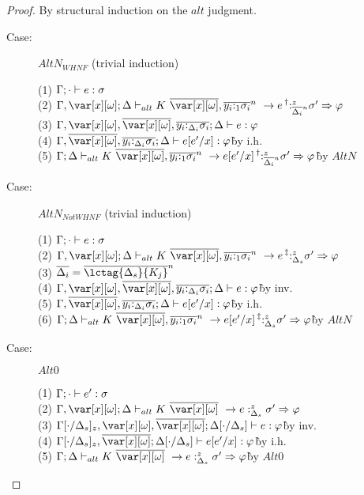 \begin{proof}
By structural induction on the $alt$ judgment.

\begin{description}

\item[Case:] $AltN_{WHNF}$ (trivial induction)
\begin{tabbing}
    (1) $\Gamma; \cdot \vdash e : \sigma$\\
    (2) $\G,\xo;\D \vdash_{alt} \konstructor~\to e \prescript{\dag}{}{:^z_{\ov{\D_i}^n}} \s' \Rightarrow \vp$\\
    (3) $\G,\xo,\ov{\xo},\ov{y_i{:}_{\D_i}\s_i}; \D \vdash e : \vp $\\
    (4) $\G,\ov{\xo},\ov{y_i{:}_{\D_i}\s_i}; \D \vdash e[e'/x] : \vp $\` by i.h.\\
    (5) $\G;\D \vdash_{alt} \konstructor~\to e[e'/x] \prescript{\dag}{}{:^z_{\ov{\D_i}^n}} \s' \Rightarrow \vp$\` by $AltN$\\
\end{tabbing}

\item[Case:] $AltN_{Not WHNF}$ (trivial induction)
\begin{tabbing}
    (1) $\Gamma; \cdot \vdash e : \sigma$\\
    (2) $\G,\xo;\D \vdash_{alt} \konstructor~\to e \prescript{\ddag}{}{:^z_{\D_s}} \s' \Rightarrow \vp$\\
    (3) $\ov{\D_i} = \ov{\lctag{\D_s}{K_j}}^n$\\
    (4) $\G,\xo,\ov{\xo},\ov{y_i{:}_{\D_i}\s_i}; \D \vdash e : \vp $\` by inv.\\
    (5) $\G,\ov{\xo},\ov{y_i{:}_{\D_i}\s_i}; \D \vdash e[e'/x] : \vp $\` by i.h.\\
    (6) $\G;\D \vdash_{alt} \konstructor~\to e[e'/x] \prescript{\ddag}{}{:^z_{\D_s}} \s' \Rightarrow \vp$\` by $AltN$\\
\end{tabbing}

\item[Case:] $Alt0$
\begin{tabbing}
    (1) $\Gamma;\cdot \vdash e' : \sigma$\\
    (2) $\G,\xo; \D \vdash_{alt} K~\ov{\xo}~\to e :^z_{\D_s} \s' \Rightarrow \vp$\\
    (3) $\G[\cdot/\D_s]_z,\xo,\ov{\xo}; \D[\cdot/\D_s] \vdash e : \vp$\` by inv.\\
    (4) $\G[\cdot/\D_s]_z,\ov{\xo}; \D[\cdot/\D_s] \vdash e[e'/x] : \vp$\` by i.h.\\
    (5) $\G; \D \vdash_{alt} K~\ov{\xo}~\to e :^z_{\D_s} \s' \Rightarrow \vp$\` by $Alt0$\\
\end{tabbing}


\end{description}
\end{proof}
